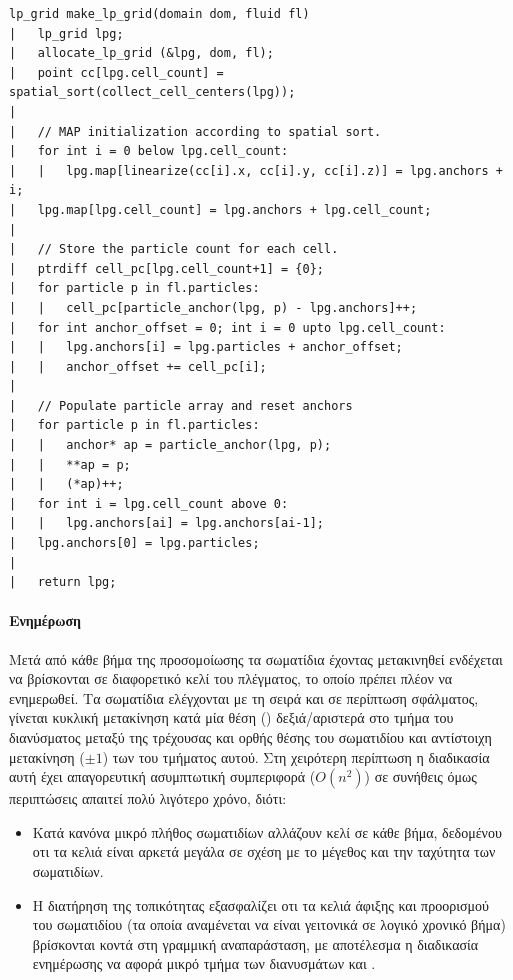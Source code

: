 \begin{verbatim}
lp_grid make_lp_grid(domain dom, fluid fl)
|   lp_grid lpg;
|   allocate_lp_grid (&lpg, dom, fl);
|   point cc[lpg.cell_count] = spatial_sort(collect_cell_centers(lpg));
|
|   // MAP initialization according to spatial sort.
|   for int i = 0 below lpg.cell_count:
|   |   lpg.map[linearize(cc[i].x, cc[i].y, cc[i].z)] = lpg.anchors + i;
|   lpg.map[lpg.cell_count] = lpg.anchors + lpg.cell_count;
|
|   // Store the particle count for each cell.
|   ptrdiff cell_pc[lpg.cell_count+1] = {0};
|   for particle p in fl.particles:
|   |   cell_pc[particle_anchor(lpg, p) - lpg.anchors]++;
|   for int anchor_offset = 0; int i = 0 upto lpg.cell_count:
|   |   lpg.anchors[i] = lpg.particles + anchor_offset;
|   |   anchor_offset += cell_pc[i];
|
|   // Populate particle array and reset anchors
|   for particle p in fl.particles:
|   |   anchor* ap = particle_anchor(lpg, p);
|   |   **ap = p;
|   |   (*ap)++;
|   for int i = lpg.cell_count above 0:
|   |   lpg.anchors[ai] = lpg.anchors[ai-1];
|   lpg.anchors[0] = lpg.particles;
|
|   return lpg;
\end{verbatim}

\paragraph{Ενημέρωση} Μετά από κάθε βήμα της προσομοίωσης τα σωματίδια έχοντας μετακινηθεί
ενδέχεται να βρίσκονται σε διαφορετικό κελί του πλέγματος, το οποίο πρέπει πλέον να
ενημερωθεί. Τα σωματίδια ελέγχονται με τη σειρά και σε περίπτωση σφάλματος, γίνεται
κυκλική μετακίνηση κατά μία θέση () δεξιά/αριστερά στο τμήμα του διανύσματος
 μεταξύ της τρέχουσας και ορθής θέσης του σωματιδίου και αντίστοιχη
μετακίνηση ($\pm 1$) των  του τμήματος αυτού. Στη χειρότερη περίπτωση η
διαδικασία αυτή έχει απαγορευτική ασυμπτωτική συμπεριφορά ($Ο(n^2)$) σε συνήθεις όμως
περιπτώσεις απαιτεί πολύ λιγότερο χρόνο, διότι:
\begin{itemize}
\item Κατά κανόνα μικρό πλήθος σωματιδίων αλλάζουν κελί σε κάθε βήμα, δεδομένου οτι τα
  κελιά είναι αρκετά μεγάλα σε σχέση με το μέγεθος και την ταχύτητα των σωματιδίων.
  
\item Η διατήρηση της τοπικότητας εξασφαλίζει οτι τα κελιά άφιξης και προορισμού του
  σωματιδίου (τα οποία αναμένεται να είναι γειτονικά σε λογικό χρονικό βήμα) βρίσκονται
  κοντά στη γραμμική αναπαράσταση, με αποτέλεσμα η διαδικασία ενημέρωσης να αφορά μικρό
  τμήμα των διανυσμάτων  και .
\end{itemize}

